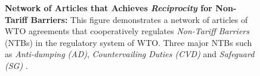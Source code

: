 \begin{figure}[h]
    \centering{
        
    }
    \caption{{\bf Network of Articles that Achieves \textit{Reciprocity} for Non-Tariff Barriers:}
        This figure demonstrates a network of articles of WTO agreements
        that cooperatively regulates \textit{Non-Tariff Barriers} (NTBs) in the regulatory system of WTO.
        Three major NTBs such as \textit{Anti-dumping (AD)}, \textit{Countervailing Duties (CVD)}
        and \textit{Safeguard (SG)} .
    }
    \label{fig:ntb-explained}
\end{figure}